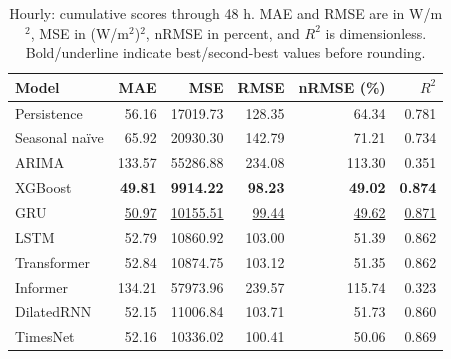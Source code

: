 \begin{table}[!htbp]
\centering
\small
\setlength{\tabcolsep}{6pt}
\caption{Hourly: cumulative scores through 48 h. MAE and RMSE are in W/m$^2$, MSE in (W/m$^2$)$^2$, nRMSE in percent, and $R^2$ is dimensionless. Bold/underline indicate best/second-best values before rounding.}
\label{tab:baseline_hourly_72_extension_48}
\begin{tabular}{@{}lrrrrr@{}}
\toprule
Model & MAE & MSE & RMSE & nRMSE (\%) & $R^2$ \\
\midrule
Persistence & 56.16 & 17019.73 & 128.35 & 64.34 & 0.781 \\
Seasonal na\"ive & 65.92 & 20930.30 & 142.79 & 71.21 & 0.734 \\
ARIMA & 133.57 & 55286.88 & 234.08 & 113.30 & 0.351 \\
XGBoost & \textbf{49.81} & \textbf{9914.22} & \textbf{98.23} & \textbf{49.02} & \textbf{0.874} \\
GRU & \underline{50.97} & \underline{10155.51} & \underline{99.44} & \underline{49.62} & \underline{0.871} \\
LSTM & 52.79 & 10860.92 & 103.00 & 51.39 & 0.862 \\
Transformer & 52.84 & 10874.75 & 103.12 & 51.35 & 0.862 \\
Informer & 134.21 & 57973.96 & 239.57 & 115.74 & 0.323 \\
DilatedRNN & 52.15 & 11006.84 & 103.71 & 51.73 & 0.860 \\
TimesNet & 52.16 & 10336.02 & 100.41 & 50.06 & 0.869 \\
\bottomrule
\end{tabular}
\end{table}

